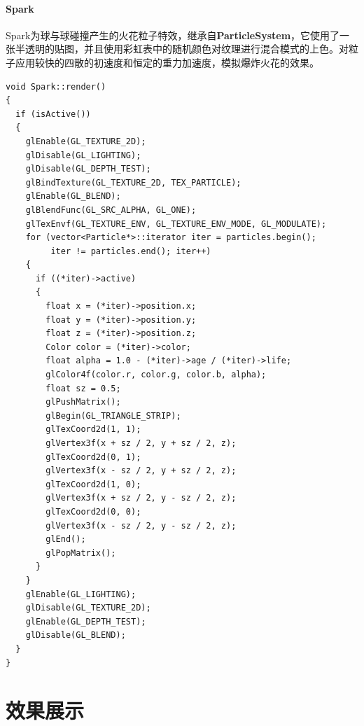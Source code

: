 \documentclass{article}
\begin{document}
            \paragraph{Spark}
            Spark为球与球碰撞产生的火花粒子特效，继承自\textbf{ParticleSystem}，它使用了一张半透明的贴图，并且使用彩虹表中的随机颜色对纹理进行混合模式的上色。对粒子应用较快的四散的初速度和恒定的重力加速度，模拟爆炸火花的效果。
            \begin{lstlisting}[language={[ANSI]C}]
void Spark::render()
{
  if (isActive())
  {
	glEnable(GL_TEXTURE_2D);	
	glDisable(GL_LIGHTING);
	glDisable(GL_DEPTH_TEST);
	glBindTexture(GL_TEXTURE_2D, TEX_PARTICLE);
	glEnable(GL_BLEND);
	glBlendFunc(GL_SRC_ALPHA, GL_ONE);
	glTexEnvf(GL_TEXTURE_ENV, GL_TEXTURE_ENV_MODE, GL_MODULATE);
	for (vector<Particle*>::iterator iter = particles.begin(); 
         iter != particles.end(); iter++)
	{
	  if ((*iter)->active)
	  {
		float x = (*iter)->position.x;
		float y = (*iter)->position.y;
		float z = (*iter)->position.z;
		Color color = (*iter)->color;
		float alpha = 1.0 - (*iter)->age / (*iter)->life;
		glColor4f(color.r, color.g, color.b, alpha);
		float sz = 0.5;
		glPushMatrix();
		glBegin(GL_TRIANGLE_STRIP);
		glTexCoord2d(1, 1); 
        glVertex3f(x + sz / 2, y + sz / 2, z);
		glTexCoord2d(0, 1); 
        glVertex3f(x - sz / 2, y + sz / 2, z);
		glTexCoord2d(1, 0); 
        glVertex3f(x + sz / 2, y - sz / 2, z);
		glTexCoord2d(0, 0); 
        glVertex3f(x - sz / 2, y - sz / 2, z);
		glEnd();
		glPopMatrix();
	  }
	}
	glEnable(GL_LIGHTING);
	glDisable(GL_TEXTURE_2D);
	glEnable(GL_DEPTH_TEST);
	glDisable(GL_BLEND);
  }	
}
            \end{lstlisting}
            \paragraph{}
    \section{效果展示}
\end{document}
